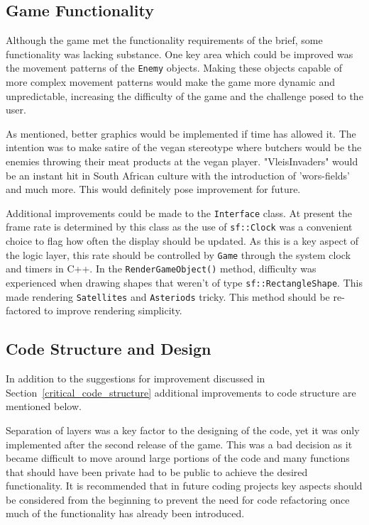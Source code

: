 \documentclass[10pt,twocolumn]{witseiepaper}
\begin{document}
\subsection{Game Functionality}

Although the game met the functionality requirements of the brief, some functionality was lacking substance. One key area which could be improved was the movement patterns of the \texttt{Enemy} objects. Making these objects capable of more complex movement patterns would make the game more dynamic and unpredictable, increasing the difficulty of the game and the challenge posed to the user.

As mentioned, better graphics would be implemented if time has allowed it. The intention was to make satire of the vegan stereotype where butchers would be the enemies throwing their meat products at the vegan player. "VleisInvaders" would be an instant hit in South African culture with the introduction of 'wors-fields' and much more. This would definitely pose improvement for future.

Additional improvements could be made to the \texttt{Interface} class. At present the frame rate is determined by this class as the use of \texttt{sf::Clock} was a convenient choice to flag how often the display should be updated. As this is a key aspect of the logic layer, this rate should be controlled by \texttt{Game} through the system clock and timers in C++. In the \texttt{RenderGameObject()} method, difficulty was experienced when drawing shapes that weren't of type \texttt{sf::RectangleShape}. This made rendering \texttt{Satellites} and \texttt{Asteriods} tricky. This method should be re-factored to improve rendering simplicity.

\subsection{Code Structure and Design}\label{code_improvements}

In addition to the suggestions for improvement discussed in Section~\ref{critical_code_structure} additional improvements to code structure are mentioned below.

Separation of layers was a key factor to the designing of the code, yet it was only implemented after the second release of the game. This was a bad decision as it became difficult to move around large portions of the code and many functions that should have been private had to be public to achieve the desired functionality. It is recommended that in future coding projects key aspects should be considered from the beginning to prevent the need for code refactoring once much of the functionality has already been introduced.
\end{document}
